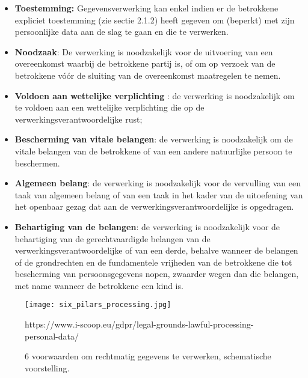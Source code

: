 \begin{itemize}
    \item \textbf{Toestemming:} Gegevensverwerking kan enkel indien er de betrokkene expliciet toestemming (zie sectie 2.1.2) heeft gegeven om (beperkt) met zijn persoonlijke data aan de slag te gaan en die te verwerken. \\
    
    \item \textbf{Noodzaak}: De verwerking is noodzakelijk voor de uitvoering van een overeenkomst waarbij de betrokkene partij is, of om op verzoek van de betrokkene vóór de sluiting van de overeenkomst maatregelen te nemen. \\
    
    \item \textbf{Voldoen aan wettelijke verplichting }: de verwerking is noodzakelijk om te voldoen aan een wettelijke verplichting die op de verwerkingsverantwoordelijke rust; \\
    
     \item \textbf{Bescherming van vitale belangen}:  de verwerking is noodzakelijk om de vitale belangen van de betrokkene of van een andere natuurlijke persoon te beschermen. \\
    
    \item \textbf{Algemeen belang}: de verwerking is noodzakelijk voor de vervulling van een taak van algemeen belang of van een taak in het kader van de uitoefening van het openbaar gezag dat aan de verwerkingsverantwoordelijke is opgedragen. \\
    
     \item \textbf{Behartiging van de belangen}: de verwerking is noodzakelijk voor de behartiging van de gerechtvaardigde belangen van de verwerkingsverantwoordelijke of van een derde, behalve wanneer de belangen of de grondrechten en de fundamentele vrijheden van de betrokkene die tot bescherming van persoonsgegevens nopen, zwaarder wegen dan die belangen, met name wanneer de betrokkene een kind is. \\
\end{itemize}

\begin{figure}[h]
    \centering
    \texttt{[image: six\_pilars\_processing.jpg]}
    \caption{6 voorwaarden om rechtmatig gegevens te verwerken, schematische voorstelling.}
    https://www.i-scoop.eu/gdpr/legal-grounds-lawful-processing-personal-data/
\end{figure}


